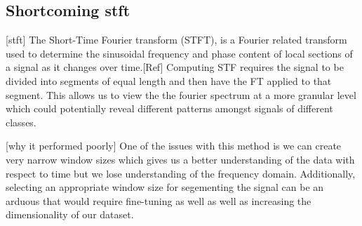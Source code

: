 \documentclass{turabian-thesis}
\begin{document}
\subsection{Shortcoming stft}
[stft]
The Short-Time Fourier transform (STFT), is a Fourier related transform used to determine the sinusoidal frequency and phase content of local sections of a signal as it changes over time.[Ref] 
Computing STF requires the signal to be divided into segments of equal length and then have the FT applied to that segment. This allows us to view the the fourier spectrum at a more granular level which could potentially reveal different patterns amongst signals of different classes.

[why it performed poorly]
One of the issues with this method is we can create very narrow window sizes which gives us a better understanding of the data with respect to time but we lose understanding of the frequency domain. Additionally, selecting an appropriate window size for segementing the signal can be an arduous that would require fine-tuning as well as well as increasing the dimensionality of our dataset.




\end{document}
